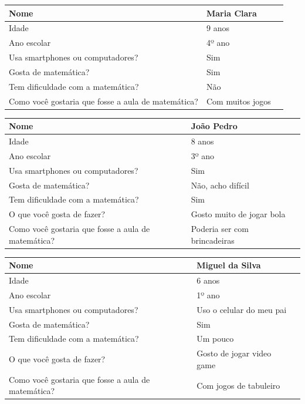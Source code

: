 \documentclass[
    12pt,               %
    openany,          	%
    twoside,            %
    a4paper,            %
    brazil              %
    ]{abntex2}
\begin{document}
\begin{center} \begin{tabular}{ | l | p{5cm} | p{6cm} }
\hline Nome & Maria Clara\\\hline
Idade & 9 anos\\ \hline
Ano escolar & 4º ano\\ \hline Usa
smartphones ou computadores? & Sim \\ \hline
Gosta de matemática? & Sim \\ \hline
Tem dificuldade com a matemática? & Não \\ \hline
Como você gostaria que fosse a aula de matemática? & Com muitos jogos \\ \hline
\end{tabular} \end{center}

\begin{center} \begin{tabular}{ | l | p{5cm} | p{6cm} }
\hline Nome & João Pedro \\\hline
Idade & 8 anos\\ \hline
Ano escolar & 3º ano\\ \hline Usa
smartphones ou computadores? & Sim \\ \hline
Gosta de matemática? & Não, acho difícil \\ \hline
Tem dificuldade com a matemática? & Sim \\ \hline
O que você gosta de fazer? & Gosto muito de jogar bola \\ \hline
Como você gostaria que fosse a aula de matemática? & Poderia ser com brincadeiras \\ \hline
\end{tabular} \end{center}

\begin{center} \begin{tabular}{ | l | p{5cm} | p{6cm} }
\hline Nome & Miguel da Silva \\\hline
Idade & 6 anos\\ \hline
Ano escolar & 1º ano\\ \hline Usa
smartphones ou computadores? & Uso o celular do meu pai \\ \hline
Gosta de matemática? & Sim \\ \hline
Tem dificuldade com a matemática? & Um pouco \\ \hline
O que você gosta de fazer? & Gosto de jogar video game \\ \hline
Como você gostaria que fosse a aula de matemática? & Com jogos de tabuleiro \\ \hline
\end{tabular} \end{center}
\end{document}
